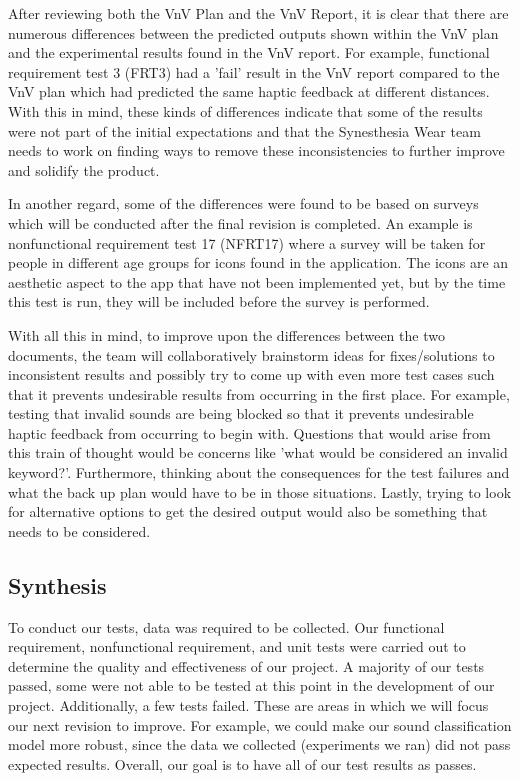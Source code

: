 \documentclass[12pt, titlepage]{article}
\begin{document}
After reviewing both the VnV Plan and the VnV Report, it is clear that there are numerous differences between the predicted outputs shown within the VnV plan and the experimental results found in the VnV report. For example, functional requirement test 3 (FRT3) had a 'fail' result in the VnV report compared to the VnV plan which had predicted the same haptic feedback at different distances. With this in mind, these kinds of differences indicate that some of the results were not part of the initial expectations and that the Synesthesia Wear team needs to work on finding ways to remove these inconsistencies to further improve and solidify the product. 

In another regard, some of the differences were found to be based on surveys which will be conducted after the final revision is completed. An example is nonfunctional requirement test 17 (NFRT17) where a survey will be taken for people in different age groups for icons found in the application. The icons are an aesthetic aspect to the app that have not been implemented yet, but by the time this test is run, they will be included before the survey is performed. 

With all this in mind, to improve upon the differences between the two documents, the team will collaboratively brainstorm ideas for fixes/solutions to inconsistent results and possibly try to come up with even more test cases such that it prevents undesirable results from occurring in the first place. For example, testing that invalid sounds are being blocked so that it prevents undesirable haptic feedback from occurring to begin with. Questions that would arise from this train of thought would be concerns like 'what would be considered an invalid keyword?'. Furthermore, thinking about the consequences for the test failures and what the back up plan would have to be in those situations. Lastly, trying to look for alternative options to get the desired output would also be something that needs to be considered.

\subsection{Synthesis}
To conduct our tests, data was required to be collected. Our functional requirement, nonfunctional requirement, and unit tests were carried out to determine the quality and effectiveness of our project. A majority of our tests passed, some were not able to be tested at this point in the development of our project. Additionally, a few tests failed. These are areas in which we will focus our next revision to improve. For example, we could make our sound classification model more robust, since the data we collected (experiments we ran) did not pass expected results. Overall, our goal is to have all of our test results as passes. 
\end{document}
